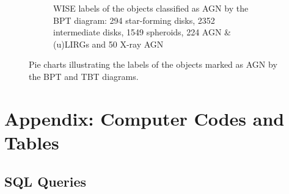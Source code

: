 \documentclass[letterpaper, oneside]{article}
\begin{document}
\begin{figure}[H]
\begin{subfigure}[b]{0.4\textwidth}
			\caption{WISE labels of the objects classified as AGN by the BPT diagram: 294 star-forming disks, 2352 intermediate disks, 1549 spheroids, 224 AGN \& (u)LIRGs and 50 X-ray AGN}
			\label{fig:T3_wise_label_pie}
		\end{subfigure}
		\caption{Pie charts illustrating the labels of the objects marked as AGN by the BPT and TBT diagrams.}
		\label{fig:wise_pie_charts}
	\end{figure}

	
	
	
	
	\pagebreak
	
	\appendix
	
	\section*{Appendix: Computer Codes and Tables}
	
	\subsection{SQL Queries}
	
\end{document}
